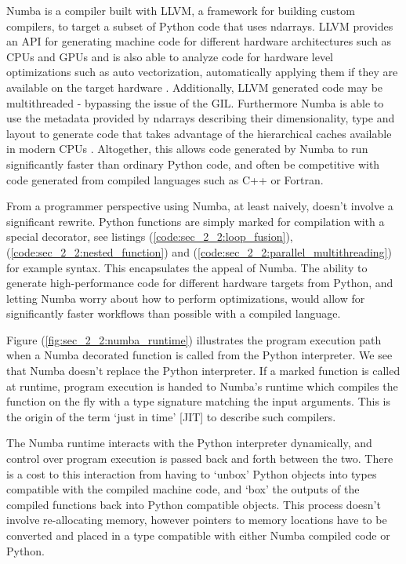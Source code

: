 Numba is a compiler built with LLVM, a framework for building custom compilers, to target a subset of Python code that uses ndarrays. LLVM provides an API for generating machine code for different hardware architectures such as CPUs and GPUs and is also able to analyze code for hardware level optimizations such as auto vectorization, automatically applying them if they are available on the target hardware \cite{lattner2004llvm}. Additionally, LLVM generated code may be multithreaded - bypassing the issue of the GIL. Furthermore Numba is able to use the metadata provided by ndarrays describing their dimensionality, type and layout to generate code that takes advantage of the hierarchical caches available in modern CPUs \cite{lam2015numba}. Altogether, this allows code generated by Numba to run significantly faster than ordinary Python code, and often be competitive with code generated from compiled languages such as C++ or Fortran. 

From a programmer perspective using Numba, at least naively, doesn't involve a significant rewrite. Python functions are simply marked for compilation with a special decorator, see listings (\ref{code:sec_2_2:loop_fusion}), (\ref{code:sec_2_2:nested_function}) and (\ref{code:sec_2_2:parallel_multithreading}) for example syntax. This encapsulates the appeal of Numba. The ability to generate high-performance code for different hardware targets from Python, and letting Numba worry about how to perform optimizations, would allow for significantly faster workflows than possible with a compiled language.

Figure (\ref{fig:sec_2_2:numba_runtime}) illustrates the program execution path when a Numba decorated function is called from the Python interpreter. We see that Numba doesn't replace the Python interpreter. If a marked function is called at runtime, program execution is handed to Numba's runtime which compiles the function on the fly with a type signature matching the input arguments. This is the origin of the term `just in time' [JIT] to describe such compilers.

The Numba runtime interacts with the Python interpreter dynamically, and control over program execution is passed back and forth between the two. There is a cost to this interaction from having to `unbox' Python objects into types compatible with the compiled machine code, and `box' the outputs of the compiled functions back into Python compatible objects. This process doesn't involve re-allocating memory, however pointers to memory locations have to be converted and placed in a type compatible with either Numba compiled code or Python.

